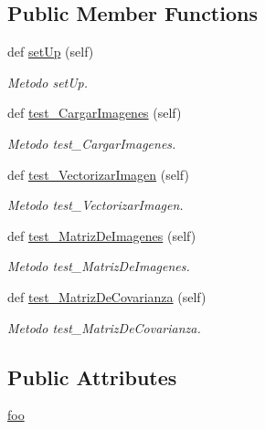 \subsection*{Public Member Functions}
\begin{DoxyCompactItemize}
\item 
def \hyperlink{class_controller_1_1_controlador_prueba_unitaria_1_1_controlador_test_a2e8184870a51acab5ddda57d6ae0a6af}{set\+Up} (self)
\begin{DoxyCompactList}\small\item\em Metodo set\+Up. \end{DoxyCompactList}\item 
def \hyperlink{class_controller_1_1_controlador_prueba_unitaria_1_1_controlador_test_ae224a62cdb566afdb168b79f44b34cb8}{test\+\_\+\+Cargar\+Imagenes} (self)
\begin{DoxyCompactList}\small\item\em Metodo test\+\_\+\+Cargar\+Imagenes. \end{DoxyCompactList}\item 
def \hyperlink{class_controller_1_1_controlador_prueba_unitaria_1_1_controlador_test_ab91d55bbbbfb2b11399063e00460fed6}{test\+\_\+\+Vectorizar\+Imagen} (self)
\begin{DoxyCompactList}\small\item\em Metodo test\+\_\+\+Vectorizar\+Imagen. \end{DoxyCompactList}\item 
def \hyperlink{class_controller_1_1_controlador_prueba_unitaria_1_1_controlador_test_a149c2fe8732cf438622aefdfad75dd4a}{test\+\_\+\+Matriz\+De\+Imagenes} (self)
\begin{DoxyCompactList}\small\item\em Metodo test\+\_\+\+Matriz\+De\+Imagenes. \end{DoxyCompactList}\item 
def \hyperlink{class_controller_1_1_controlador_prueba_unitaria_1_1_controlador_test_a7bdd98073dfdcbe13627c7bee7d64f55}{test\+\_\+\+Matriz\+De\+Covarianza} (self)
\begin{DoxyCompactList}\small\item\em Metodo test\+\_\+\+Matriz\+De\+Covarianza. \end{DoxyCompactList}\end{DoxyCompactItemize}
\subsection*{Public Attributes}
\begin{DoxyCompactItemize}
\item 
\hyperlink{class_controller_1_1_controlador_prueba_unitaria_1_1_controlador_test_a2f176dc83cda878c82e90b5eed2c321a}{foo}
\end{DoxyCompactItemize}


